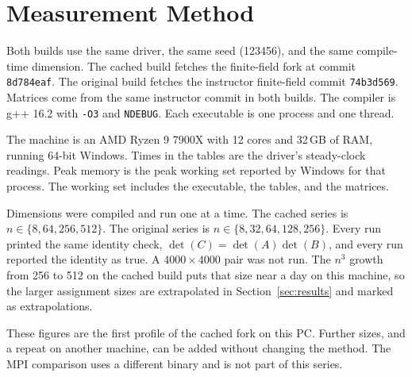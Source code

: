 \section{Measurement Method}
\label{sec:method}

Both builds use the same driver, the same seed (123456), and the same compile-time dimension.
The cached build fetches the finite-field fork at commit \texttt{8d784eaf}.
The original build fetches the instructor finite-field commit \texttt{74b3d569}.
Matrices come from the same instructor commit in both builds.
The compiler is g++ 16.2 with \texttt{-O3} and \texttt{NDEBUG}.
Each executable is one process and one thread.

The machine is an AMD Ryzen 9 7900X with 12 cores and 32\,GB of RAM, running 64-bit Windows.
Times in the tables are the driver's steady-clock readings.
Peak memory is the peak working set reported by Windows for that process.
The working set includes the executable, the tables, and the matrices.

Dimensions were compiled and run one at a time.
The cached series is \(n \in \{8, 64, 256, 512\}\).
The original series is \(n \in \{8, 32, 64, 128, 256\}\).
Every run printed the same identity check, \(\det(C) = \det(A)\det(B)\), and every run reported the identity as true.
A \(4000 \times 4000\) pair was not run.
The \(n^3\) growth from 256 to 512 on the cached build puts that size near a day on this machine, so the larger assignment sizes are extrapolated in Section~\ref{sec:results} and marked as extrapolations.

These figures are the first profile of the cached fork on this PC.
Further sizes, and a repeat on another machine, can be added without changing the method.
The MPI comparison uses a different binary and is not part of this series.
